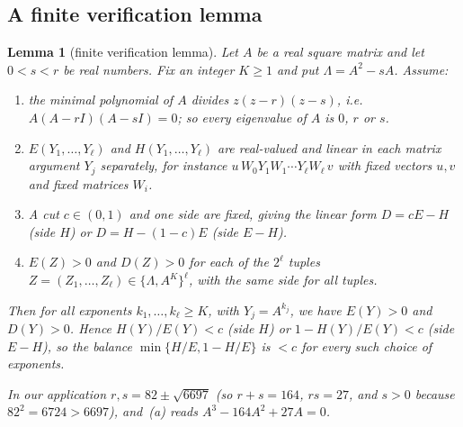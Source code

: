\documentclass[11pt]{amsart}
\newtheorem{lemma}[theorem]{Lemma}
\theoremstyle{definition}
\theoremstyle{remark}
\begin{document}
\subsection*{A finite verification lemma}
\begin{lemma}[finite verification lemma]\label{lem:finite}
Let $A$ be a real square matrix and let $0<s<r$ be real numbers. Fix an integer $K\ge1$ and put $\Lambda=A^2-sA$. Assume:
\begin{enumerate}
\item[(a)] the minimal polynomial of $A$ divides $z(z-r)(z-s)$, i.e.\ $A(A-rI)(A-sI)=0$; so every eigenvalue of $A$ is $0$, $r$ or $s$.
\item[(b)] $E(Y_1,\dots,Y_\ell)$ and $H(Y_1,\dots,Y_\ell)$ are real-valued and linear in each matrix argument $Y_j$ separately, for instance $u\,W_0Y_1W_1\cdots Y_\ell W_\ell\,v$ with fixed vectors $u,v$ and fixed matrices $W_i$.
\item[(c)] A cut $c\in(0,1)$ and one \emph{side} are fixed, giving the linear form $D=cE-H$ (side $H$) or $D=H-(1-c)E$ (side $E-H$).
\item[(d)] $E(Z)>0$ and $D(Z)>0$ for each of the $2^\ell$ tuples $Z=(Z_1,\dots,Z_\ell)\in\{\Lambda,A^K\}^\ell$, with the same side for all tuples.
\end{enumerate}
Then for all exponents $k_1,\dots,k_\ell\ge K$, with $Y_j=A^{k_j}$, we have $E(Y)>0$ and $D(Y)>0$. Hence $H(Y)/E(Y)<c$ (side $H$) or $1-H(Y)/E(Y)<c$ (side $E-H$), so the balance $\min\{H/E,1-H/E\}$ is $<c$ for every such choice of exponents.

In our application $r,s=82\pm\sqrt{6697}$ (so $r+s=164$, $rs=27$, and $s>0$ because $82^2=6724>6697$), and~(a) reads $A^3-164A^2+27A=0$.
\end{lemma}
\end{document}
